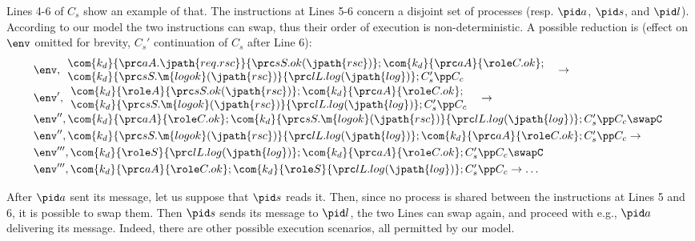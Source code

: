 Lines 4-6 of $C_s$ show an example of that. 
The instructions at Lines 5-6 concern a disjoint set of processes (resp. $\pid
a$, $\pid s$, and $\pid l$). According to our model the two instructions can
swap, thus their order of execution is non-deterministic. A possible reduction
is (effect on $\env$ omitted for brevity, $C_s'$ continuation of $C_s$ after
Line 6):
{\scriptsize
$$
\hspace{-.5em}\begin{array}{ll}
\hspace{-.5em}\begin{array}{l}
	\env, \begin{array}{l}
		\com{k_d}{\prc aA.\jpath{req.rsc}}{\prc sS.ok(\jpath{rsc})};
	  \com{k_d}{\prc aA}{\role C.ok};
	  \\
		\com{k_d}{\prc sS.\m{logok}(\jpath{rsc})}{\prc lL.log(\jpath{log})};
		C_s' \pp C_c	
	\end{array}
\end{array}
\to
\\[7pt]
\hspace{-.5em}\begin{array}{l}
	\env', \begin{array}{l}
		\com{k_d}{\role A}{\prc sS.ok(\jpath{rsc})};
	  \com{k_d}{\prc aA}{\role C.ok};
	  \\
		\com{k_d}{\prc sS.\m{logok}(\jpath{rsc})}{\prc lL.log(\jpath{log})};
		C_s' \pp C_c	
	\end{array}
\end{array}
\to
\\[7pt]
\env'',
	  \com{k_d}{\prc aA}{\role C.ok};
		\com{k_d}{\prc sS.\m{logok}(\jpath{rsc})}{\prc lL.log(\jpath{log})};
		C_s' \pp C_c	
\swapC
\\[3pt]
\env'',
		\com{k_d}{\prc sS.\m{logok}(\jpath{rsc})}{\prc lL.log(\jpath{log})};
	  \com{k_d}{\prc aA}{\role C.ok};
		C_s' \pp C_c	
\to
\\[3pt]
\env''',
		\com{k_d}{\role S}{\prc lL.log(\jpath{log})};
	  \com{k_d}{\prc aA}{\role C.ok};
		C_s' \pp C_c	
\swapC
\\[3pt]
\env''',
	  \com{k_d}{\prc aA}{\role C.ok};
		\com{k_d}{\role S}{\prc lL.log(\jpath{log})};
		C_s' \pp C_c	
\to \ldots
\end{array}
$$
}

After $\pid a$ sent its message, let us suppose that $\pid s$ reads it. Then,
since no process is shared between the instructions at Lines 5 and 6, it is
possible to swap them. Then $\pid s$ sends its message to $\pid l$, the two
Lines can swap again, and proceed with e.g., $\pid a$ delivering its message.
Indeed, there are other possible execution scenarios, all permitted by our
model.

